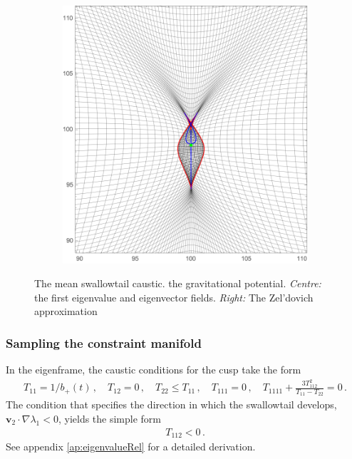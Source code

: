 \documentclass[a4paper, 11pt]{article}
\begin{document}
\begin{figure}
\begin{subfigure}[b]{0.32\textwidth}
\end{subfigure}~
\begin{subfigure}[b]{0.32\textwidth}
\includegraphics[width=\textwidth]{Swallowtail_mean_Z}
\end{subfigure}
\caption{The mean swallowtail caustic.  the gravitational potential. \textit{Centre:} the first eigenvalue and eigenvector fields. \textit{Right:} The Zel'dovich approximation}\label{fig:meanSwallowtail}
\end{figure}


\subsubsection{Sampling the constraint manifold}
In the eigenframe, the caustic conditions for the cusp take the form
\begin{align}
T_{11}=1/b_+(t)\,, \quad T_{12}=0\,,\quad T_{22}\leq T_{11}\,,\quad T_{111}=0\,, \quad T_{1111}+\frac{3T_{112}^2}{T_{11}-T_{22}} =0\,.
\end{align}
The condition that specifies the direction in which the swallowtail develops, $\bm{v}_2 \cdot \nabla \lambda_1  <0$, yields the simple form 
\begin{align}
T_{112} <0\,.
\end{align}
See appendix \ref{ap:eigenvalueRel} for a detailed derivation. 
\end{document}
